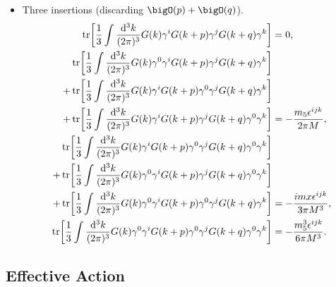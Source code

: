 \documentclass[letterpaper]{article}
\begin{document}
\begin{itemize}
    \item Three insertions (discarding $\bigO(p)+\bigO(q)$).
    \begin{align*}
        \tr[\frac{1}{3} \int \frac{\dd[3]{k}}{(2\pi)^3} G(k) \gamma^i G(k+p)\gamma^j G(k+q) \gamma^k] &= 0, \\
        \tr[\frac{1}{3} \int \frac{\dd[3]{k}}{(2\pi)^3} G(k)\gamma^0 \gamma^i G(k+p)\gamma^j G(k+q) \gamma^k] & \\
        +\tr[\frac{1}{3} \int \frac{\dd[3]{k}}{(2\pi)^3} G(k)\gamma^i G(k+p)\gamma^0 \gamma^j G(k+q) \gamma^k] & \\
        +\tr[\frac{1}{3} \int \frac{\dd[3]{k}}{(2\pi)^3} G(k)\gamma^i G(k+p)\gamma^j G(k+q) \gamma^0 \gamma^k] &= -\frac{m_5 \epsilon^{ijk}}{2\pi M}, \\
        \tr[\frac{1}{3} \int \frac{\dd[3]{k}}{(2\pi)^3} G(k)\gamma^i G(k+p)\gamma^0 \gamma^j G(k+q) \gamma^0 \gamma^k] & \\
        +\tr[\frac{1}{3} \int \frac{\dd[3]{k}}{(2\pi)^3} G(k)\gamma^0 \gamma^i G(k+p)\gamma^j G(k+q) \gamma^0 \gamma^k] & \\
        +\tr[\frac{1}{3} \int \frac{\dd[3]{k}}{(2\pi)^3} G(k)\gamma^0 \gamma^i G(k+p)\gamma^0 \gamma^j G(k+q) \gamma^k] &= -\frac{i m x \epsilon^{ijk}}{3\pi M^3}, \\
        \tr[\frac{1}{3} \int \frac{\dd[3]{k}}{(2\pi)^3} G(k)\gamma^0 \gamma^i G(k+p)\gamma^0 \gamma^j G(k+q)\gamma^0 \gamma^k] &= -\frac{m_5^3 \epsilon^{ijk}}{6\pi M^3}.
    \end{align*}
\end{itemize}

\subsection*{Effective Action}


\end{document}
